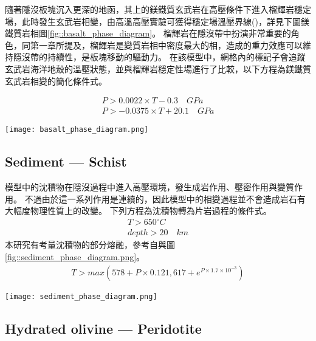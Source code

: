 隨著隱沒板塊沉入更深的地函，其上的鎂鐵質玄武岩在高壓條件下進入榴輝岩穩定場，此時發生玄武岩相變，由高溫高壓實驗可獲得穩定場溫壓界線(\citealp{Hacker2003})，詳見下圖鎂鐵質岩相圖\ref{fig::basalt_phase_diagram}。
榴輝岩在隱沒帶中扮演非常重要的角色，同第一章所提及，榴輝岩是變質岩相中密度最大的相，造成的重力效應可以維持隱沒帶的持續性，是板塊移動的驅動力。
在該模型中，網格內的標記子會追蹤玄武岩海洋地殼的溫壓狀態，並與榴輝岩穩定性場進行了比較，以下方程為鎂鐵質玄武岩相變的簡化條件式。

\begin{align}
    P > 0.0022 \times T -0.3  \quad GPa\\
    P > -0.0375 \times T + 20.1  \quad GPa
\end{align}

\begin{figure*}[ht!]
    \centering
    \texttt{[image: basalt\_phase\_diagram.png]}
    \caption{鎂鐵質岩相圖，綠線隔開玄武岩與榴輝岩的穩定場，改編自\citealp{Hacker2003}，橘線為鎂鐵質岩的濕固相線(wet solidus)，改編自\citealp{Gutscher2000Bcan}}
    \label{fig::basalt_phase_diagram}
\end{figure*}

\subsection{Sediment --- Schist}
模型中的沈積物在隱沒過程中進入高壓環境，發生成岩作用、壓密作用與變質作用。
不過由於這一系列作用是連續的，因此模型中的相變過程並不會造成岩石有大幅度物理性質上的改變。
下列方程為沈積物轉為片岩過程的條件式。
\begin{align}
T > 650^{\circ} C\\
depth >  20  \quad km 
\end{align}
本研究有考量沈積物的部分熔融，參考自\citealp{Forster2021}與圖\ref{fig::sediment_phase_diagram.png}。
\begin{align}
    T > max (578+ P \times 0.121, 617+e^{P\times 1.7\times 10^{-3}})
\end{align}

\begin{figure*}[ht!]
    \centering
    \texttt{[image: sediment\_phase\_diagram.png]}
    \caption{沈積物變質岩相圖，橘線為沈積物濕固相線，改編自\citealp{Forster2021}。}
    \label{fig::sediment_phase_diagram.png}
\end{figure*}


\subsection{Hydrated olivine --- Peridotite}

